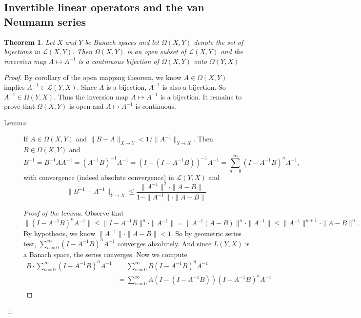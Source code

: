 \documentclass[12pt]{article}
\theoremstyle{plain}
\newtheorem{thm}{Theorem}
\theoremstyle{definition}
\begin{document}
\subsection*{Invertible linear operators and the van Neumann series}
\begin{thm}
    Let $X$ and $Y$ be Banach spaces and let $\Omega(X,Y)$ denote the set of
    bijections in $\mathcal{L}(X,Y)$.
    Then $\Omega(X,Y)$ is an open subset of $\mathcal{L}(X,Y)$ and the inversion map
    $A\mapsto A^{-1}$ is a continuous bijection of $\Omega(X,Y)$ onto
    $\Omega(Y,X)$
\end{thm}
\begin{proof}
    By corollary of the open mapping theorem, we know $A\in\Omega(X,Y)$ implies
    $A^{-1}\in \mathcal{L}(Y,X)$.
    Since $A$ is a bijection, $A^{-1}$ is also a bijection.
    So $A^{-1}\in\Omega(Y,X)$.
    Thus the inversion map $A\mapsto A^{-1}$ is a bijection.
    It remains to prove that $\Omega(X,Y)$ is open and $A\mapsto A^{-1}$ is
    continuous.
    \begin{description}
        \item[Lemma: ]
            If $A\in\Omega(X,Y)$ and $\|B-A\|_{X\rightarrow
            Y}<1/\|A^{-1}\|_{Y\rightarrow X}$.
            Then $B\in\Omega(X,Y)$ and 
            \[
                B^{-1} =  B^{-1}AA^{-1} = 
                (A^{-1}B)^{-1}A^{-1}=(I-(I-A^{-1}B))^{-1}A^{-1} = \sum_{n=0}^\infty(I-A^{-1}B)^n A^{-1},
            \]
            with convergence (indeed absolute convergence) in $\mathcal{L}(Y,X)$ and
            \[
                \|B^{-1}-A^{-1}\|_{Y\rightarrow X}\leq\frac{\|A^{-1}\|^2\cdot\|A-B\|}{1-\|A^{-1}\|\cdot\|A-B\|}
            \]
            \begin{proof}[Proof of the lemma]
                Observe that 
                \[
                    \|(I-A^{-1}B)^nA^{-1}\|\leq
                    \|I-A^{-1}B\|^n\cdot \|A^{-1}\|
                    =\|A^{-1}(A-B)\|^n\cdot\|A^{-1}\|
                    \leq \|A^{-1}\|^{n+1}\cdot\|A-B\|^n.
                \]
                By hypothesis, we know $\|A^{-1}\|\cdot\|A-B\|<1$.
                So by geometric series test, $\sum_{n=0}^\infty (I-A^{-1}B)^nA^{-1}$ converges absolutely.
                And since $L(Y,X)$ is a Banach space, the series converges.
                Now we compute 
                \[\begin{aligned}
                    B\cdot\sum_{n=0}^\infty (I-A^{-1}B)^nA^{-1}
                    &= \sum_{n=0}^\infty B(I-A^{-1}B)^nA^{-1}\\
                    &= \sum_{n=0}^\infty A(I-(I-A^{-1}B))(I-A^{-1}B)^nA^{-1}\\

\end{aligned}\]
\end{proof}
\end{description}
\end{proof}
\end{document}

